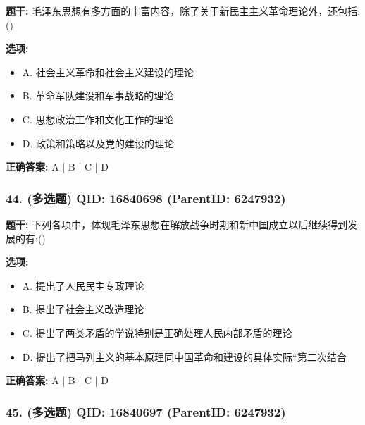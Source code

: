 \documentclass[12pt,UTF8]{ctexart}
\begin{document}
\textbf{题干:}
毛泽东思想有多方面的丰富内容，除了关于新民主主义革命理论外，还包括:()



\textbf{选项:}
\begin{itemize}[leftmargin=*]

  \item A. 社会主义革命和社会主义建设的理论

  \item B. 革命军队建设和军事战略的理论

  \item C. 思想政治工作和文化工作的理论

  \item D. 政策和策略以及党的建设的理论

\end{itemize}

\textbf{正确答案:}
A | B | C | D

\vspace{0.3em}\hrulefill\vspace{0.7em}

\subsubsection*{44. (多选题) \small QID: 16840698 (ParentID: 6247932)}

\textbf{题干:}
下列各项中，体现毛泽东思想在解放战争时期和新中国成立以后继续得到发展的有:()



\textbf{选项:}
\begin{itemize}[leftmargin=*]

  \item A. 提出了人民民主专政理论

  \item B. 提出了社会主义改造理论

  \item C. 提出了两类矛盾的学说特别是正确处理人民内部矛盾的理论

  \item D. 提出了把马列主义的基本原理同中国革命和建设的具体实际“第二次结合

\end{itemize}

\textbf{正确答案:}
A | B | C | D

\vspace{0.3em}\hrulefill\vspace{0.7em}

\subsubsection*{45. (多选题) \small QID: 16840697 (ParentID: 6247932)}
\end{document}
